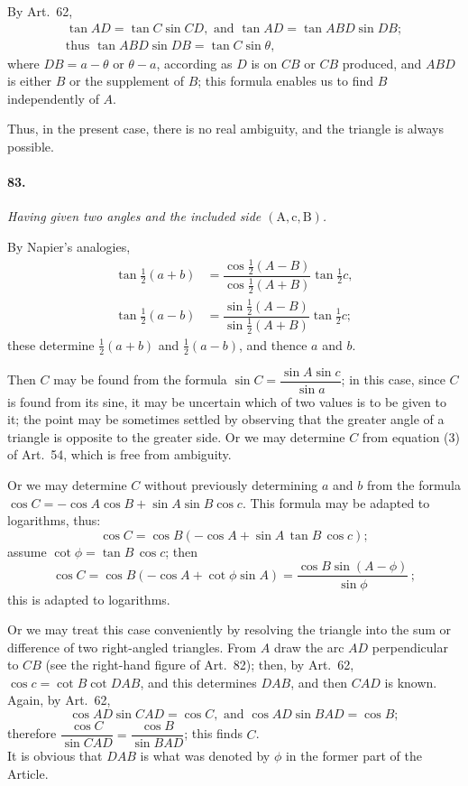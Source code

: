 \documentclass{book}[2004/02/16]
\begin{document}
\begin{mainmatter}
\begin{spacing}{1.3}
By Art.\ 62,
\begin{gather*}
  \tan AD = \tan C \sin CD,\text{ and }\tan AD = \tan ABD \sin DB; \\
  \text{thus } \tan ABD \sin DB = \tan C \sin \theta,
\end{gather*}
where $DB = a - \theta$ or $\theta - a$, according as $D$ is on $CB$ or $CB$ produced,
and $ABD$ is either $B$ or the supplement of $B$; this formula
enables us to find $B$ independently of $A$.

Thus, in the present case, there is no real ambiguity, and the
triangle is always possible.

\paragraph{83.} \textit{Having given two angles and the included side $\mathrm{(A, c, B)}$.}

By Napier's analogies,
\begin{align*}
   \tan \tfrac{1}{2} (a + b)
&= \dfrac{\cos \tfrac{1}{2} (A - B)}{\cos \tfrac{1}{2} (A + B)} \tan \tfrac{1}{2} c, \\[1ex]
   \tan \tfrac{1}{2} (a - b)
&= \dfrac{\sin \tfrac{1}{2} (A - B)}{\sin \tfrac{1}{2} (A + B)} \tan \tfrac{1}{2} c;
\end{align*}
these determine $\tfrac{1}{2} (a + b)$ and $\tfrac{1}{2} (a - b)$, and thence $a$ and $b$.

Then $C$ may be found from the formula $\sin C = \dfrac{\sin A \sin c}{\sin a}$; in
this case, since $C$ is found from its sine, it may be uncertain which
of two values is to be given to it; the point may be sometimes
settled by observing that the greater angle of a triangle is opposite
to the greater side. Or we may determine $C$ from equation (3) of
Art.\ 54, which is free from ambiguity.

Or we may determine $C$ without previously determining $a$ and
$b$ from the formula $\cos C = -\cos A \cos B + \sin A \sin B \cos c$. This
formula may be adapted to logarithms, thus:
\[
\cos C = \cos B (-\cos A + \sin A\, \tan B\, \cos c);
\]
assume $\cot \phi = \tan B\, \cos c$; then
\[
\cos C = \cos B (-\cos A + \cot \phi \sin A) = \dfrac{\cos B \sin (A-\phi)}{\sin \phi}\,;
\]
this is adapted to logarithms.

Or we may treat this case conveniently by resolving the triangle
into the sum or difference of two right-angled triangles.
From $A$ draw the arc $AD$ perpendicular to $CB$ (see the right-hand
figure of Art.\ 82); then, by Art.\ 62, $\cos c = \cot B \cot DAB$,
and this determines $DAB$, and then $CAD$ is known. Again,
by Art.\ 62,
\[
\cos AD \sin CAD = \cos C,\text{ and }\cos AD \sin BAD = \cos B;
\]
therefore $\dfrac{\cos C}{\sin CAD}
= \dfrac{\cos B}{\sin BAD}$; this finds $C$.
\\[1ex]
It is obvious that $DAB$ is what was denoted by $\phi$ in the former
part of the Article.


\end{spacing}
\end{mainmatter}
\end{document}
